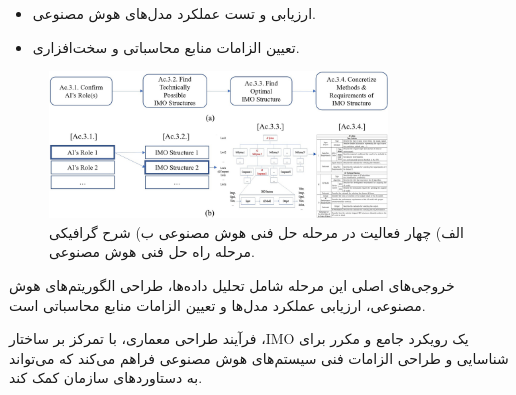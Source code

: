 \documentclass[a4paper,10pt]{article}
\begin{document}
\begin{itemize}
\begin{itemize}
                        \item ارزیابی و تست عملکرد مدل‌های هوش مصنوعی.

                        \item تعیین الزامات منابع محاسباتی و سخت‌افزاری.

                    \end{itemize}

                    \begin{figure}[htbp]

                        \centering
                        \includegraphics[width=0.8\textwidth]{image/fig 8.png}
                        \caption{الف) چهار فعالیت در مرحله حل فنی هوش مصنوعی ب) شرح گرافیکی مرحله راه حل فنی هوش مصنوعی.}
                        \label{fig:fig_8}
                    
                    \end{figure}

                    خروجی‌های اصلی این مرحله شامل تحلیل داده‌ها، طراحی الگوریتم‌های هوش مصنوعی، ارزیابی عملکرد مدل‌ها و تعیین الزامات منابع محاسباتی است.

                \end{itemize}

                فرآیند طراحی معماری، با تمرکز بر ساختار ،IMO یک رویکرد جامع و مکرر برای شناسایی و طراحی الزامات فنی سیستم‌های هوش مصنوعی فراهم می‌کند که می‌تواند به دستاوردهای سازمان کمک کند.

                
\end{document}
